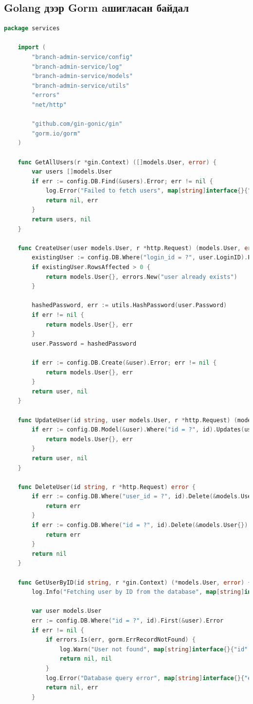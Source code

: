 \subsection{Golang дээр Gorm aшигласан байдал}
\begin{lstlisting}[language=Go, frame=single]
	package services

	import (
		"branch-admin-service/config"
		"branch-admin-service/log"
		"branch-admin-service/models"
		"branch-admin-service/utils"
		"errors"
		"net/http"
	
		"github.com/gin-gonic/gin"
		"gorm.io/gorm"
	)
	
	func GetAllUsers(r *gin.Context) ([]models.User, error) {
		var users []models.User
		if err := config.DB.Find(&users).Error; err != nil {
			log.Error("Failed to fetch users", map[string]interface{}{"error": err.Error()}, r)
			return nil, err
		}
		return users, nil
	}
	
	func CreateUser(user models.User, r *http.Request) (models.User, error) {
		existingUser := config.DB.Where("login_id = ?", user.LoginID).First(&models.User{})
		if existingUser.RowsAffected > 0 {
			return models.User{}, errors.New("user already exists")
		}
	
		hashedPassword, err := utils.HashPassword(user.Password)
		if err != nil {
			return models.User{}, err
		}
		user.Password = hashedPassword
	
		if err := config.DB.Create(&user).Error; err != nil {
			return models.User{}, err
		}
		return user, nil
	}
	
	func UpdateUser(id string, user models.User, r *http.Request) (models.User, error) {
		if err := config.DB.Model(&user).Where("id = ?", id).Updates(user).Error; err != nil {
			return models.User{}, err
		}
		return user, nil
	}
	
	func DeleteUser(id string, r *http.Request) error {
		if err := config.DB.Where("user_id = ?", id).Delete(&models.UserRole{}).Error; err != nil {
			return err
		}
		if err := config.DB.Where("id = ?", id).Delete(&models.User{}).Error; err != nil {
			return err
		}
		return nil
	}
	
	func GetUserByID(id string, r *gin.Context) (*models.User, error) {
		log.Info("Fetching user by ID from the database", map[string]interface{}{"id": id}, r)
	
		var user models.User
		err := config.DB.Where("id = ?", id).First(&user).Error
		if err != nil {
			if errors.Is(err, gorm.ErrRecordNotFound) {
				log.Warn("User not found", map[string]interface{}{"id": id}, r)
				return nil, nil
			}
			log.Error("Database query error", map[string]interface{}{"error": err.Error()}, r)
			return nil, err
		}
	

\end{lstlisting}
